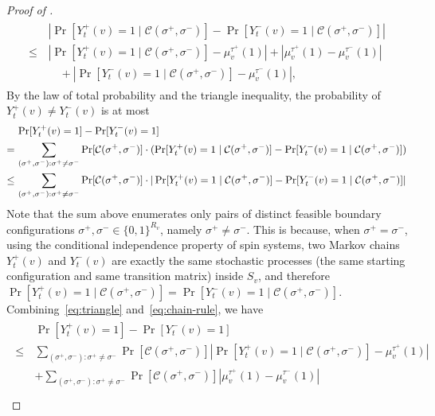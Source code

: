 \documentclass[11pt]{amsart}
\renewcommand{\Pr}{\mathop{\mathrm{Pr}}\nolimits}
\newcommand{\abs}[1]{\ensuremath{\left\vert#1\right\vert}}
\renewcommand{\P}{\Pr}
\theoremstyle{definition}
\theoremstyle{remark}
\begin{document}
\begin{proof}[Proof of ]
\begin{align}
\begin{split}\label{eq:triangle}
    &\abs{\Pr[Y_t^+(v) = 1 \mid \mathcal{C}(\sigma^+,\sigma^-)] - \Pr[Y_t^-(v) = 1 \mid \mathcal{C}(\sigma^+,\sigma^-)]}\\
    \leq\,& \left | \P[Y_t^+(v)=1 \mid \mathcal{C}(\sigma^+,\sigma^-)] -\mu_v^{\tau^+}(1) \right | + \left | \mu_v^{\tau^+}(1)-\mu_v^{\tau^-}(1)\right |\\
    &\quad + \left | \P[Y_t^-(v)=1 \mid \mathcal{C}(\sigma^+,\sigma^-)] -\mu_v^{\tau^-}(1) \right |,
\end{split}
\end{align}
By the law of total probability and the triangle inequality, the probability of $Y^+_t (v) \neq Y_t^-(v)$ is at most
\begin{align}\label{eq:chain-rule}
    & \Pr[Y_t^+(v) = 1] - \Pr[Y_t^-(v) = 1] \notag\\
    =\,& \sum_{(\sigma^+,\sigma^-):\sigma^+ \neq \sigma^-} \Pr[\mathcal{C}(\sigma^+,\sigma^-)] \cdot (\P[Y_t^+(v) = 1 \mid \mathcal{C}(\sigma^+,\sigma^-)] - \P[Y_t^-(v) = 1 \mid \mathcal{C}(\sigma^+,\sigma^-)])\notag\\
    \leq\,& \sum_{(\sigma^+,\sigma^-):\sigma^+ \neq \sigma^-} \Pr[\mathcal{C}(\sigma^+,\sigma^-)] \cdot |\P[Y_t^+(v) = 1 \mid \mathcal{C}(\sigma^+,\sigma^-)] - \P[Y_t^-(v) = 1 \mid \mathcal{C}(\sigma^+,\sigma^-)]|
\end{align}
Note that the sum above enumerates only pairs of distinct feasible boundary configurations $\sigma^+,\sigma^- \in \{0,1\}^{R_v}$, namely $\sigma^+ \neq \sigma^-$.
This is because, when $\sigma^+ = \sigma^-$, using the conditional independence property of spin systems, two Markov chains $Y^+_t(v)$ and $Y^-_t(v)$ are exactly the same stochastic processes (the same starting configuration and same transition matrix) inside $S_v$, and therefore $\Pr[Y_t^+(v) = 1 \mid \mathcal{C}(\sigma^+,\sigma^-)] = \Pr[Y_t^-(v) = 1 \mid \mathcal{C}(\sigma^+,\sigma^-)]$. 
Combining~\eqref{eq:triangle} and~\eqref{eq:chain-rule}, we have
\begin{align}
\begin{split}\label{eq:sum-of-three}
    &\Pr[Y_t^+(v) = 1] - \Pr[Y_t^-(v) = 1]\\
     \leq\,& \sum_{(\sigma^+,\sigma^-):\sigma^+\neq \sigma^-} \Pr[\mathcal{C}(\sigma^+,\sigma^-)] \left | \P[Y_t^+(v)=1 \mid \mathcal{C}(\sigma^+,\sigma^-)] -\mu_v^{\tau^+}(1) \right |\\
    &+\sum_{(\sigma^+,\sigma^-):\sigma^+\neq \sigma^-} \Pr[\mathcal{C}(\sigma^+,\sigma^-)] \left | \mu_v^{\tau^+}(1)-\mu_v^{\tau^-}(1)\right |\\

\end{split}
\end{align}
\end{proof}
\end{document}
